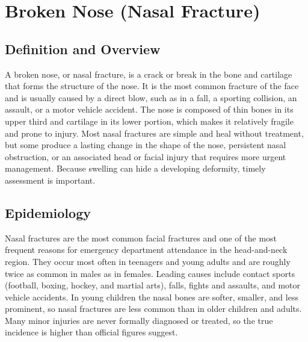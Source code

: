 \chapter{Broken Nose (Nasal Fracture)}

\section*{Definition and Overview}
A broken nose, or nasal fracture, is a crack or break in the bone and cartilage that forms the structure of the nose. It is the most common fracture of the face and is usually caused by a direct blow, such as in a fall, a sporting collision, an assault, or a motor vehicle accident. The nose is composed of thin bones in its upper third and cartilage in its lower portion, which makes it relatively fragile and prone to injury. Most nasal fractures are simple and heal without treatment, but some produce a lasting change in the shape of the nose, persistent nasal obstruction, or an associated head or facial injury that requires more urgent management. Because swelling can hide a developing deformity, timely assessment is important.

\section*{Epidemiology}
Nasal fractures are the most common facial fractures and one of the most frequent reasons for emergency department attendance in the head-and-neck region. They occur most often in teenagers and young adults and are roughly twice as common in males as in females. Leading causes include contact sports (football, boxing, hockey, and martial arts), falls, fights and assaults, and motor vehicle accidents. In young children the nasal bones are softer, smaller, and less prominent, so nasal fractures are less common than in older children and adults. Many minor injuries are never formally diagnosed or treated, so the true incidence is higher than official figures suggest.

